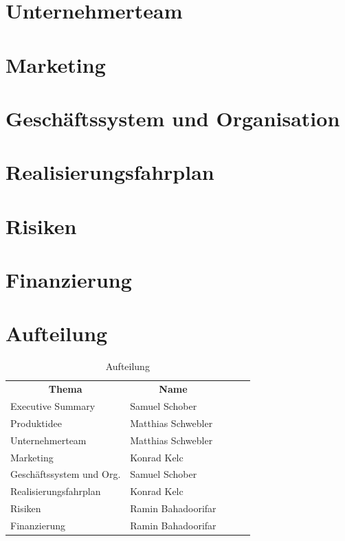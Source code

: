\documentclass[11pt]{article}
\begin{document}
\section{Unternehmerteam}
\section{Marketing}
\section{Gesch\"aftssystem und Organisation}
\section{Realisierungsfahrplan}
\section{Risiken}
\section{Finanzierung}

\newpage
\section{Aufteilung}
\begin{table}[ht]
	\centering
	\begin{tabular}{|l|l|lll}
		\cline{1-2}
		\multicolumn{1}{|c|}{\textbf{Thema}} & \multicolumn{1}{c|}{\textbf{Name}} &  &  &  \\ \cline{1-2}
		Executive Summary                    & Samuel Schober                     &  &  &  \\ \cline{1-2}
		Produktidee                          & Matthias Schwebler                 &  &  &  \\ \cline{1-2}
		Unternehmerteam                      & Matthias Schwebler                 &  &  &  \\ \cline{1-2}
		Marketing                            & Konrad Kelc                        &  &  &  \\ \cline{1-2}
		Geschäftssystem und Org.             & Samuel Schober                     &  &  &  \\ \cline{1-2}
		Realisierungsfahrplan                & Konrad Kelc                        &  &  &  \\ \cline{1-2}
		Risiken                              & Ramin Bahadoorifar                 &  &  &  \\ \cline{1-2}
		Finanzierung                         & Ramin Bahadoorifar                 &  &  &  \\ \cline{1-2}
	\end{tabular}
	\caption{Aufteilung}
\end{table}
\end{document}
